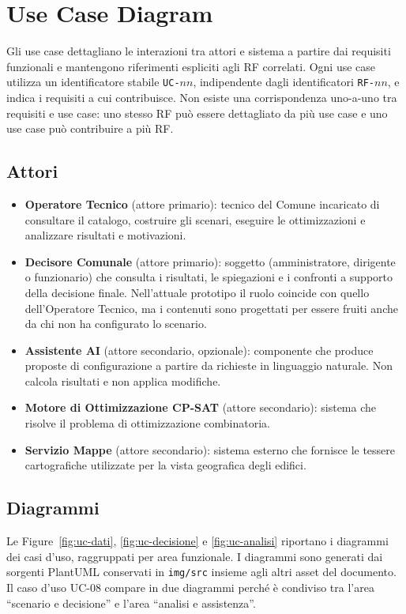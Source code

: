 \section{Use Case Diagram}
\label{sec:UC}

Gli use case dettagliano le interazioni tra attori e sistema a partire dai requisiti funzionali e mantengono riferimenti espliciti agli RF correlati. Ogni use case utilizza un identificatore stabile \texttt{UC-$nn$}, indipendente dagli identificatori \texttt{RF-$nn$}, e indica i requisiti a cui contribuisce. Non esiste una corrispondenza uno-a-uno tra requisiti e use case: uno stesso RF può essere dettagliato da più use case e uno use case può contribuire a più RF.

\subsection*{Attori}
\begin{itemize}[leftmargin=1.4em, itemsep=0.2em]
    \item \textbf{Operatore Tecnico} (attore primario): tecnico del Comune incaricato di consultare il catalogo, costruire gli scenari, eseguire le ottimizzazioni e analizzare risultati e motivazioni.
    \item \textbf{Decisore Comunale} (attore primario): soggetto (amministratore, dirigente o funzionario) che consulta i risultati, le spiegazioni e i confronti a supporto della decisione finale. Nell'attuale prototipo il ruolo coincide con quello dell'Operatore Tecnico, ma i contenuti sono progettati per essere fruiti anche da chi non ha configurato lo scenario.
    \item \textbf{Assistente AI} (attore secondario, opzionale): componente che produce proposte di configurazione a partire da richieste in linguaggio naturale. Non calcola risultati e non applica modifiche.
    \item \textbf{Motore di Ottimizzazione CP-SAT} (attore secondario): sistema che risolve il problema di ottimizzazione combinatoria.
    \item \textbf{Servizio Mappe} (attore secondario): sistema esterno che fornisce le tessere cartografiche utilizzate per la vista geografica degli edifici.
\end{itemize}

\subsection*{Diagrammi}
Le Figure~\ref{fig:uc-dati}, \ref{fig:uc-decisione} e \ref{fig:uc-analisi} riportano i diagrammi dei casi d'uso, raggruppati per area funzionale. I diagrammi sono generati dai sorgenti PlantUML conservati in \texttt{img/src} insieme agli altri asset del documento. Il caso d'uso UC-08 compare in due diagrammi perché è condiviso tra l'area ``scenario e decisione'' e l'area ``analisi e assistenza''.

